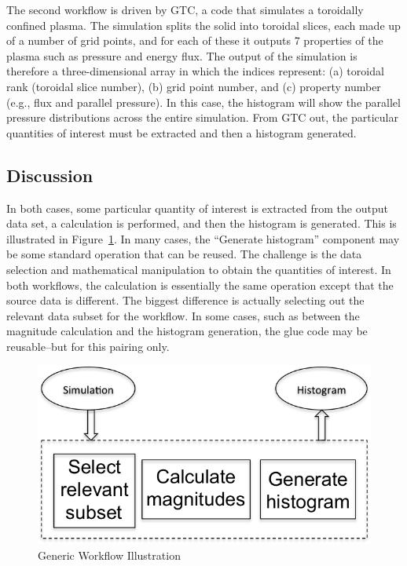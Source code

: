 \documentclass[conference]{IEEEtran}
\begin{document}
The second workflow is driven by GTC, a code that simulates a toroidally
confined plasma. The simulation splits the solid into toroidal slices, each
made up of a number of grid points, and for each of these it outputs 7
properties of the plasma such as pressure and energy flux. The output of the
simulation is therefore a three-dimensional array in which the indices
represent: (a) toroidal rank (toroidal slice number), (b) grid point number,
and (c) property number (e.g., flux and parallel pressure). In this case, the
histogram will show the parallel pressure distributions across the entire
simulation. From GTC out, the particular quantities of interest must be
extracted and then a histogram generated.

\subsection{Discussion}

In both cases, some particular quantity of interest is extracted from the
output data set, a calculation is performed, and then the histogram is
generated. This is illustrated in Figure~\ref{fig:generic-workflow}. In many
cases, the ``Generate histogram'' component may be some standard operation that
can be reused. The challenge is the data selection and mathematical
manipulation to obtain the quantities of interest. In both workflows, the
calculation is essentially the same operation except that the source data is
different. The biggest difference is actually selecting out the relevant data
subset for the workflow. In some cases, such as between the magnitude
calculation and the histogram generation, the glue code may be reusable--but
for this pairing only.

\begin{figure}[htbp]
\centering
\includegraphics[width=\columnwidth]{fig/Generic-Start}
\caption{Generic Workflow Illustration}
\label{fig:generic-workflow}
\end{figure}
\end{document}
